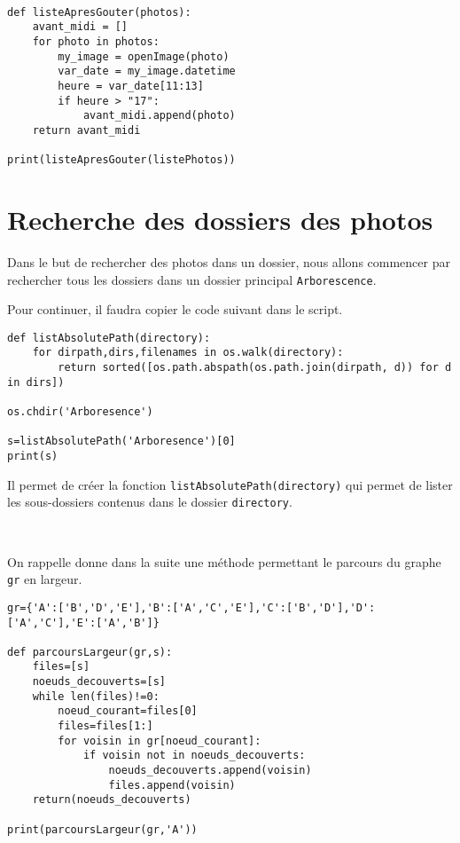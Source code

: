 \begin{solution}~\ \\
\begin{verbatim}
def listeApresGouter(photos):
    avant_midi = []
    for photo in photos:
        my_image = openImage(photo)
        var_date = my_image.datetime
        heure = var_date[11:13]
        if heure > "17":
            avant_midi.append(photo)
    return avant_midi

print(listeApresGouter(listePhotos))
\end{verbatim}
\end{solution}

\section{Recherche des dossiers des photos}

Dans le but de rechercher des photos dans un dossier, nous allons commencer par rechercher tous les dossiers dans un dossier principal \verb?Arborescence?.

Pour continuer, il faudra copier le code suivant dans le script.

\begin{verbatim}
def listAbsolutePath(directory):
    for dirpath,dirs,filenames in os.walk(directory):
        return sorted([os.path.abspath(os.path.join(dirpath, d)) for d in dirs])

os.chdir('Arboresence')

s=listAbsolutePath('Arboresence')[0]
print(s)
\end{verbatim}

Il permet de créer la fonction \verb?listAbsolutePath(directory)? qui permet de lister les sous-dossiers contenus dans le dossier \verb?directory?. 

~\

On rappelle donne dans la suite une méthode permettant le parcours du graphe \verb?gr? en largeur.

\begin{verbatim}
gr={'A':['B','D','E'],'B':['A','C','E'],'C':['B','D'],'D':['A','C'],'E':['A','B']}

def parcoursLargeur(gr,s):
    files=[s]
    noeuds_decouverts=[s]
    while len(files)!=0:
        noeud_courant=files[0]
        files=files[1:]
        for voisin in gr[noeud_courant]:
            if voisin not in noeuds_decouverts:
                noeuds_decouverts.append(voisin)
                files.append(voisin)
    return(noeuds_decouverts)

print(parcoursLargeur(gr,'A'))
\end{verbatim}

